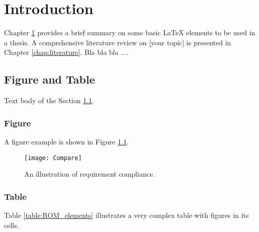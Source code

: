 \chapter{Introduction} \label{chap:introdcution}

 Chapter \ref{chap:introdcution} provides a brief summary on some basic \LaTeX{} elements to be used in a thesis. A comprehensive literature review on [your topic] is presented in Chapter \ref{chap:literature}. Bla bla bla ....
 
 \section{Figure and Table}  \label{sec:FigureAndTable}

 Text body of the Section \ref{sec:FigureAndTable}.
 
 \subsection{Figure}  \label{subSec:Figure}

 
 A figure example is shown in Figure \ref{fig:Compare}.
 
 \begin{figure}
     \begin{center}
         \texttt{[image: Compare]}  %
        \end{center}
        \caption{An illustration of requirement compliance.}
        \label{fig:Compare}
    \end{figure}
    
    
\subsection{Table}  \label{subSec:Table}
    
 Table \ref{table:ROM_elements} illustrates a very complex table with figures in its cells.
 

